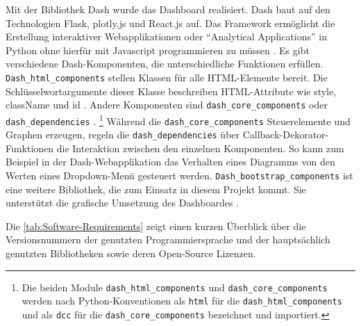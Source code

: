     Mit der Bibliothek Dash wurde das Dashboard realisiert. Dash baut auf den Technologien Flask, plotly.js und React.js auf. Das Framework ermöglicht die Erstellung interaktiver Webapplikationen 
    oder \enquote{Analytical Applications} in Python ohne hierfür mit Javascript programmieren zu müssen \cite[vgl.][]{plotly_dash_2021}.
    Es gibt verschiedene Dash-Komponenten, die unterschiedliche Funktionen erfüllen. \texttt{Dash\_html\_components} stellen Klassen für alle HTML-Elemente bereit.
    Die Schlüsselwortargumente dieser Klasse beschreiben HTML-Attribute wie style, className und id \cite[vgl.][]{plotly_dash_2021-2}. 
    Andere Komponenten sind \texttt{dash\_core\_components} oder \texttt{dash\_dependencies} \cite[vgl.][]{plotly_dash_2021-1}.
    \footnote{Die beiden Module \texttt{dash\_html\_components} und \texttt{dash\_core\_components} werden nach Python-Konventionen als \texttt{html} für die \texttt{dash\_html\_components} und als \texttt{dcc} für die \texttt{dash\_core\_components} bezeichnet und importiert.}
    Während die \texttt{dash\_core\_components}
    Steuerelemente und Graphen erzeugen, regeln die \texttt{dash\_dependencies} über Callback-Dekorator-Funktionen die Interaktion zwischen den einzelnen Komponenten.
    So kann zum Beispiel in der Dash-Webapplikation das Verhalten eines Diagramms von den Werten eines Dropdown-Menü gesteuert werden. 
    \texttt{Dash\_bootstrap\_components} ist eine weitere Bibliothek, die zum Einsatz in diesem Projekt kommt. Sie unterstützt die grafische Umsetzung
    des Dashboardes \cite[vgl.][]{faculty_dash_2021}.

    Die \autoref{tab:Software-Requirements} zeigt einen kurzen Überblick über die Versionsnummern der genutzten Programmiersprache und der hauptsächlich 
    genutzten Bibliotheken sowie deren Open-Source Lizenzen.
    
